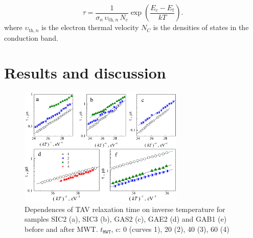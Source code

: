 \documentclass[final,3p,times,twocolumn,authoryear]{elsarticle}
\begin{document}
\cite{OstrovPAN,OstrovskiiSST}

\begin{equation}\label{eqPANtau}
  \tau=\frac{1}{\sigma_n\,\upsilon_{\mathrm{th},n}\,N_c}\exp\left(\frac{E_c-E_t}{kT}\right).
\end{equation}
where
$\upsilon_{\mathrm{th},n}$ is the electron thermal velocity
$N_C$ is the densities of states in the conduction band.


\cite{Godwod}


\cite{Belyaev1998JTFEn}

\section{Results and discussion}\label{sec3}


\begin{figure}
\center
\includegraphics[width=0.7\textwidth]{Fig3}
\caption{\label{figTauTAV}
Dependences of TAV relaxation time on inverse temperature for samples SIC2 (a), SIC3 (b), GAS2 (c), GAE2 (d) and GAB1 (e) before and after MWT.
$t_\mathtt{MWT}$, c: 0 (curves 1), 20 (2), 40 (3), 60 (4)
}%
\end{figure}


\end{document}
